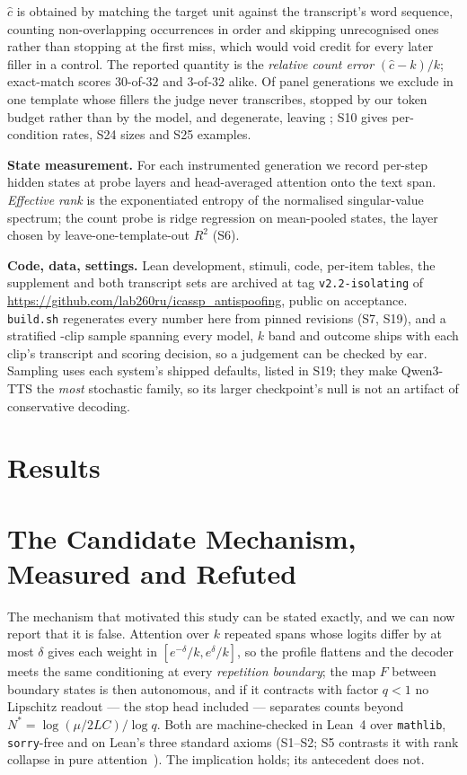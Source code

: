 \documentclass{article}
\begin{document}
$\hat c$ is obtained by matching the target unit against the transcript's word
sequence, counting non-overlapping occurrences in order and skipping
unrecognised ones rather than stopping at the first miss, which would void
credit for every later filler in a control. The reported quantity is the
\emph{relative count error} $(\hat c - k)/k$; exact-match scores $30$-of-$32$
and $3$-of-$32$ alike. Of \MainNGen{} panel generations we exclude
\MainExclTmpl{} in one template whose fillers the judge never transcribes,
\MainExclCap{} stopped by our token budget rather than by the model, and
\MainExclDegen{} degenerate, leaving \MainKept{}; S10 gives per-condition
rates, S24 sizes and S25 examples.

\noindent\textbf{State measurement.}
For each instrumented generation we record per-step hidden states at probe
layers and head-averaged attention onto the text span. \emph{Effective rank} is the
exponentiated entropy of the normalised singular-value spectrum; the count probe
is ridge regression on mean-pooled states, the layer chosen by
leave-one-template-out $R^2$ (S6).

\noindent\textbf{Code, data, settings.}
Lean development, stimuli, code, per-item tables, the supplement and both
transcript sets are archived at tag \texttt{v2.2-isolating} of
\url{https://github.com/lab260ru/icassp_antispoofing}, public on acceptance. \texttt{build.sh} regenerates every number here from pinned revisions
(S7, S19), and a stratified \SampleN{}-clip sample spanning every model, $k$ band
and outcome ships with each clip's transcript and scoring decision, so a
judgement can be checked by ear. Sampling uses each system's shipped defaults,
listed in S19; they make Qwen3-TTS the \emph{most} stochastic family, so its
larger checkpoint's null is not an artifact of conservative decoding.

\section{Results}
\label{sec:results}



\section{The Candidate Mechanism, Measured and Refuted}
\label{sec:theory}

The mechanism that motivated this study can be stated exactly, and we can now
report that it is false. Attention over $k$ repeated spans whose logits differ
by at most $\delta$ gives each weight in $[e^{-\delta}/k,e^{\delta}/k]$, so the
profile flattens and the decoder meets the same conditioning at every
\emph{repetition boundary}; the map $F$ between boundary states is then
autonomous, and if it contracts with factor $q<1$ no Lipschitz readout --- the
stop head included --- separates counts beyond $N^\ast=\log(\mu/2LC)/\log q$. Both are machine-checked in Lean~4 over
\texttt{mathlib}, \texttt{sorry}-free and on Lean's three standard axioms
(S1--S2; S5
contrasts it with rank collapse in pure
attention~\cite{dong2021attention}). The implication holds; its antecedent does
not.
\end{document}
